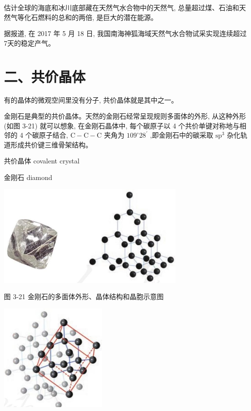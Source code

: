 \documentclass[10pt]{article}
\begin{document}
估计全球的海底和冰川底部藏在天然气水合物中的天然气, 总量超过煤、石油和天然气等化石燃料的总和的两倍, 是巨大的潜在能源。

据报道, 在 2017 年 5 月 18 日, 我国南海神狐海域天然气水合物试采实现连续超过7天的稳定产气。

\section*{二、共价晶体}

有的晶体的微观空间里没有分子, 共价晶体就是其中之一。

金刚石是典型的共价晶体。天然的金刚石经常呈现规则多面体的外形, 从这种外形 (如图 3-21) 就可以想象, 在金刚石晶体中, 每个碳原子以 4 个共价单键对称地与相邻的 4 个碳原子结合, \(\mathrm{C} - \mathrm{C} - \mathrm{C}\) 夹角为 \({109}^{ \circ }{28}^{\prime }\) ,即金刚石中的碳采取 \({\mathrm{{sp}}}^{3}\) 杂化轨道形成共价键三维骨架结构。

\begin{mdframed}

共价晶体 covalent crystal

金刚石 diamond

\end{mdframed}

\begin{center}
\includegraphics[max width=0.7\textwidth]{images/0190e026-5a11-7df7-bd27-54d09026ba7a_84_935737.jpg}
\end{center}

图 3-21 金刚石的多面体外形、晶体结构和晶胞示意图

\begin{center}
\includegraphics[max width=0.4\textwidth]{images/0190e026-5a11-7df7-bd27-54d09026ba7a_84_279058.jpg}
\end{center}
\end{document}
